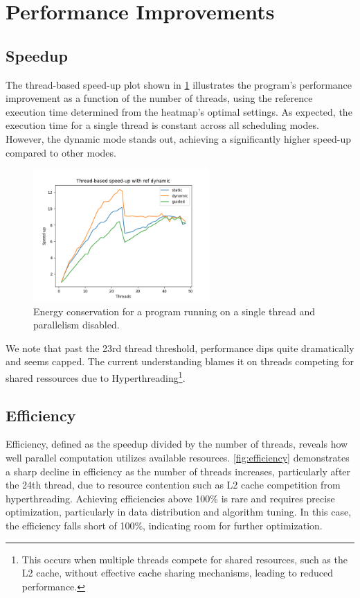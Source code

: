 \documentclass[english,11pt]{article}
\begin{document}
\section{Performance Improvements}
\subsection{Speedup}
The thread-based speed-up plot shown in \ref{fig:speedup} illustrates the program's performance improvement as a function of the number of threads, using the reference execution time determined from the heatmap's optimal settings. As expected, the execution time for a single thread is constant across all scheduling modes. However, the dynamic mode stands out, achieving a significantly higher speed-up compared to other modes.

\begin{figure}[h!]
    \centering
    \includegraphics[width=0.6\textwidth]{graph/TB_SU_ref-dynamic.png}
    \caption{Energy conservation for a program running on a single thread and parallelism disabled.}
    \label{fig:speedup}
\end{figure}

We note that past the 23rd thread threshold, performance dips quite dramatically and seems capped. The current understanding blames it on threads competing for shared ressources due to Hyperthreading\footnote{This occurs when multiple threads compete for shared resources, such as the L2 cache, without effective cache sharing mechanisms, leading to reduced performance.}.

\subsection{Efficiency}
Efficiency, defined as the speedup divided by the number of threads, reveals how well parallel computation utilizes available resources. \ref{fig:efficiency} demonstrates a sharp decline in efficiency as the number of threads increases, particularly after the 24th thread, due to resource contention such as L2 cache competition from hyperthreading. Achieving efficiencies above 100\% is rare and requires precise optimization, particularly in data distribution and algorithm tuning. In this case, the efficiency falls short of 100\%, indicating room for further optimization.
\end{document}
